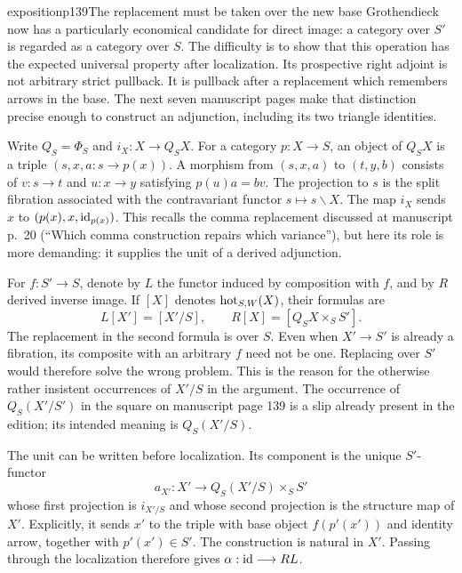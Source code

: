 \begin{dcomment}{exposition}{p139}{The replacement must be taken over the new base}
Grothendieck now has a particularly economical candidate for direct image: a category over $S'$ is regarded as a category over $S$. The difficulty is to show that this operation has the expected universal property after localization. Its prospective right adjoint is not arbitrary strict pullback. It is pullback after a replacement which remembers arrows in the base. The next seven manuscript pages make that distinction precise enough to construct an adjunction, including its two triangle identities.

Write $Q_S=\Phi_S$ and $i_X:X\longrightarrow Q_SX$. For a category $p:X\longrightarrow S$, an object of $Q_SX$ is a triple $(s,x,a:s\longrightarrow p(x))$. A morphism from $(s,x,a)$ to $(t,y,b)$ consists of $v:s\longrightarrow t$ and $u:x\longrightarrow y$ satisfying $p(u)a=bv$. The projection to $s$ is the split fibration associated with the contravariant functor $s\longmapsto s\backslash X$. The map $i_X$ sends $x$ to $(p(x),x,\mathrm{id}_{p(x)})$. This recalls the comma replacement discussed at manuscript p.~20 (``Which comma construction repairs which variance''), but here its role is more demanding: it supplies the unit of a derived adjunction.

For $f:S'\longrightarrow S$, denote by $L$ the functor induced by composition with $f$, and by $R$ derived inverse image. If $[X]$ denotes $\mathrm{hot}_{S,W}(X)$, their formulas are
\[
 L[X']=[X'/S],\qquad R[X]=[Q_SX\times_SS'].
\]
The replacement in the second formula is over $S$. Even when $X'\longrightarrow S'$ is already a fibration, its composite with an arbitrary $f$ need not be one. Replacing over $S'$ would therefore solve the wrong problem. This is the reason for the otherwise rather insistent occurrences of $X'/S$ in the argument. The occurrence of $Q_S(X'/S')$ in the square on manuscript page 139 is a slip already present in the edition; its intended meaning is $Q_S(X'/S)$.

The unit can be written before localization. Its component is the unique $S'$-functor
\[
 a_{X'}:X'\longrightarrow Q_S(X'/S)\times_SS'
\]
whose first projection is $i_{X'/S}$ and whose second projection is the structure map of $X'$. Explicitly, it sends $x'$ to the triple with base object $f(p'(x'))$ and identity arrow, together with $p'(x')\in S'$. The construction is natural in $X'$. Passing through the localization therefore gives $\alpha:\mathrm{id}\longrightarrow RL$.


\end{dcomment}
